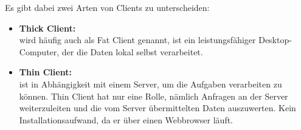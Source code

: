 Es gibt dabei zwei Arten von Clients zu unterscheiden:
\begin{itemize}
\item \textbf{Thick Client:}\\
wird häufig auch als Fat Client genannt, ist ein leistungsfähiger Desktop-Computer, der die Daten lokal selbst verarbeitet.
\item \textbf{Thin Client:}\\
ist in Abhängigkeit mit einem Server, um die Aufgaben verarbeiten zu können. Thin Client hat nur eine Rolle, nämlich Anfragen an der Server weiterzuleiten und die vom Server übermittelten Daten auszuwerten. Kein Installationsaufwand, da er über einen Webbrowser läuft. 
\end{itemize}